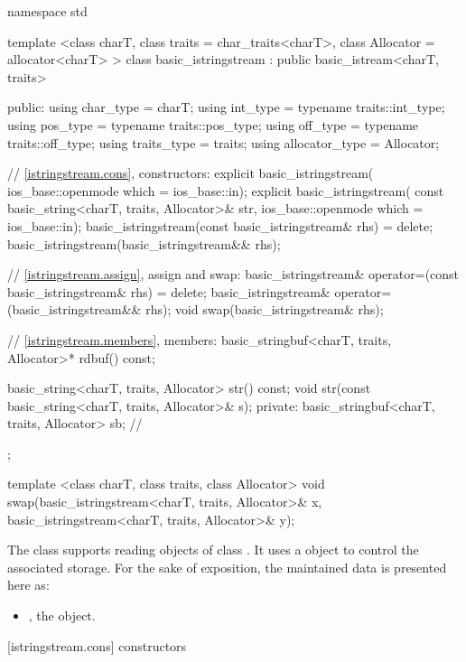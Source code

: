 %
\begin{codeblock}
namespace std {
  template <class charT, class traits = char_traits<charT>,
            class Allocator = allocator<charT> >
  class basic_istringstream
    : public basic_istream<charT, traits> {
  public:
    using char_type      = charT;
    using int_type       = typename traits::int_type;
    using pos_type       = typename traits::pos_type;
    using off_type       = typename traits::off_type;
    using traits_type    = traits;
    using allocator_type = Allocator;

    // \ref{istringstream.cons}, constructors:
    explicit basic_istringstream(
      ios_base::openmode which = ios_base::in);
    explicit basic_istringstream(
      const basic_string<charT, traits, Allocator>& str,
      ios_base::openmode which = ios_base::in);
    basic_istringstream(const basic_istringstream& rhs) = delete;
    basic_istringstream(basic_istringstream&& rhs);

    // \ref{istringstream.assign}, assign and swap:
    basic_istringstream& operator=(const basic_istringstream& rhs) = delete;
    basic_istringstream& operator=(basic_istringstream&& rhs);
    void swap(basic_istringstream& rhs);

    // \ref{istringstream.members}, members:
    basic_stringbuf<charT, traits, Allocator>* rdbuf() const;

    basic_string<charT, traits, Allocator> str() const;
    void str(const basic_string<charT, traits, Allocator>& s);
  private:
    basic_stringbuf<charT, traits, Allocator> sb; // \expos
  };

  template <class charT, class traits, class Allocator>
    void swap(basic_istringstream<charT, traits, Allocator>& x,
              basic_istringstream<charT, traits, Allocator>& y);
}
\end{codeblock}

\pnum
The class
supports reading objects of class
.
It uses a
object to control the associated storage.
For the sake of exposition, the maintained data is presented here as:
\begin{itemize}
\item
{}, the  object.
\end{itemize}

[istringstream.cons]{ constructors}

